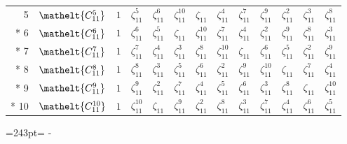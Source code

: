 \documentclass[10pt,a4paper]{article}
\newcommand{\needspace}[1]{\par\penalty-100\begingroup\dimen0=#1\relax\dimen2=\pagegoal
  \advance\dimen2-\pagetotal\ifdim\dimen0>\dimen2\relax\ifdim\dimen2>0pt\vfil\break\fi\fi
  \endgroup}
\numberwithin{equation}{section}
\newcommand{\eltfont}[1]{{\let\sigma\eltsigma\mathelt{#1}}}
\newcommand{\cls}[1]{\eltfont{#1}}
\newcommand{\rootunity}[1]{\zeta_{#1}}
\begin{document}
{\begin{longtable}{@{}rllllllllllll@{}}
5 & $\cls{C_{11}^{5}}$ & $1$ & $\rootunity{11}^{5}$ & $\rootunity{11}^{6}$ & $\rootunity{11}^{10}$ & $\rootunity{11}$ & $\rootunity{11}^{4}$ & $\rootunity{11}^{7}$ & $\rootunity{11}^{9}$ & $\rootunity{11}^{2}$ & $\rootunity{11}^{3}$ & $\rootunity{11}^{8}$\\*
6 & $\cls{C_{11}^{6}}$ & $1$ & $\rootunity{11}^{6}$ & $\rootunity{11}^{5}$ & $\rootunity{11}$ & $\rootunity{11}^{10}$ & $\rootunity{11}^{7}$ & $\rootunity{11}^{4}$ & $\rootunity{11}^{2}$ & $\rootunity{11}^{9}$ & $\rootunity{11}^{8}$ & $\rootunity{11}^{3}$\\*
7 & $\cls{C_{11}^{7}}$ & $1$ & $\rootunity{11}^{7}$ & $\rootunity{11}^{4}$ & $\rootunity{11}^{3}$ & $\rootunity{11}^{8}$ & $\rootunity{11}^{10}$ & $\rootunity{11}$ & $\rootunity{11}^{6}$ & $\rootunity{11}^{5}$ & $\rootunity{11}^{2}$ & $\rootunity{11}^{9}$\\*
8 & $\cls{C_{11}^{8}}$ & $1$ & $\rootunity{11}^{8}$ & $\rootunity{11}^{3}$ & $\rootunity{11}^{5}$ & $\rootunity{11}^{6}$ & $\rootunity{11}^{2}$ & $\rootunity{11}^{9}$ & $\rootunity{11}^{10}$ & $\rootunity{11}$ & $\rootunity{11}^{7}$ & $\rootunity{11}^{4}$\\*
9 & $\cls{C_{11}^{9}}$ & $1$ & $\rootunity{11}^{9}$ & $\rootunity{11}^{2}$ & $\rootunity{11}^{7}$ & $\rootunity{11}^{4}$ & $\rootunity{11}^{5}$ & $\rootunity{11}^{6}$ & $\rootunity{11}^{3}$ & $\rootunity{11}^{8}$ & $\rootunity{11}$ & $\rootunity{11}^{10}$\\*
10 & $\cls{C_{11}^{10}}$ & $1$ & $\rootunity{11}^{10}$ & $\rootunity{11}$ & $\rootunity{11}^{9}$ & $\rootunity{11}^{2}$ & $\rootunity{11}^{8}$ & $\rootunity{11}^{3}$ & $\rootunity{11}^{7}$ & $\rootunity{11}^{4}$ & $\rootunity{11}^{6}$ & $\rootunity{11}^{5}$\\
\bottomrule\end{longtable}}
\needspace{243pt}
\end{document}
